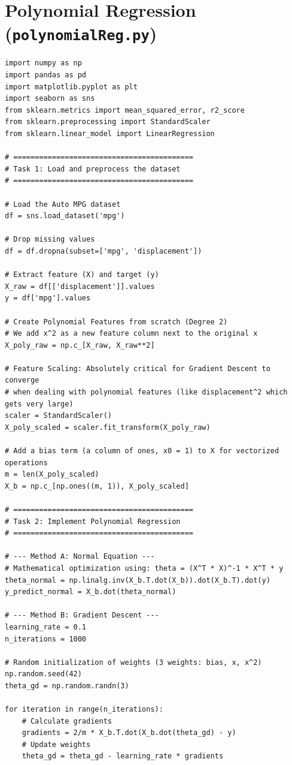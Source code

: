 \documentclass[11pt,a4paper]{article}
\begin{document}
\section*{Polynomial Regression (\texttt{polynomialReg.py})}
\begin{lstlisting}
import numpy as np
import pandas as pd
import matplotlib.pyplot as plt
import seaborn as sns
from sklearn.metrics import mean_squared_error, r2_score
from sklearn.preprocessing import StandardScaler
from sklearn.linear_model import LinearRegression

# ==========================================
# Task 1: Load and preprocess the dataset
# ==========================================

# Load the Auto MPG dataset
df = sns.load_dataset('mpg')

# Drop missing values
df = df.dropna(subset=['mpg', 'displacement'])

# Extract feature (X) and target (y)
X_raw = df[['displacement']].values
y = df['mpg'].values

# Create Polynomial Features from scratch (Degree 2)
# We add x^2 as a new feature column next to the original x
X_poly_raw = np.c_[X_raw, X_raw**2]

# Feature Scaling: Absolutely critical for Gradient Descent to converge 
# when dealing with polynomial features (like displacement^2 which gets very large)
scaler = StandardScaler()
X_poly_scaled = scaler.fit_transform(X_poly_raw)

# Add a bias term (a column of ones, x0 = 1) to X for vectorized operations
m = len(X_poly_scaled)
X_b = np.c_[np.ones((m, 1)), X_poly_scaled]

# ==========================================
# Task 2: Implement Polynomial Regression
# ==========================================

# --- Method A: Normal Equation ---
# Mathematical optimization using: theta = (X^T * X)^-1 * X^T * y
theta_normal = np.linalg.inv(X_b.T.dot(X_b)).dot(X_b.T).dot(y)
y_predict_normal = X_b.dot(theta_normal)

# --- Method B: Gradient Descent ---
learning_rate = 0.1
n_iterations = 1000

# Random initialization of weights (3 weights: bias, x, x^2)
np.random.seed(42)
theta_gd = np.random.randn(3) 

for iteration in range(n_iterations):
    # Calculate gradients
    gradients = 2/m * X_b.T.dot(X_b.dot(theta_gd) - y)
    # Update weights
    theta_gd = theta_gd - learning_rate * gradients


\end{lstlisting}
\end{document}
